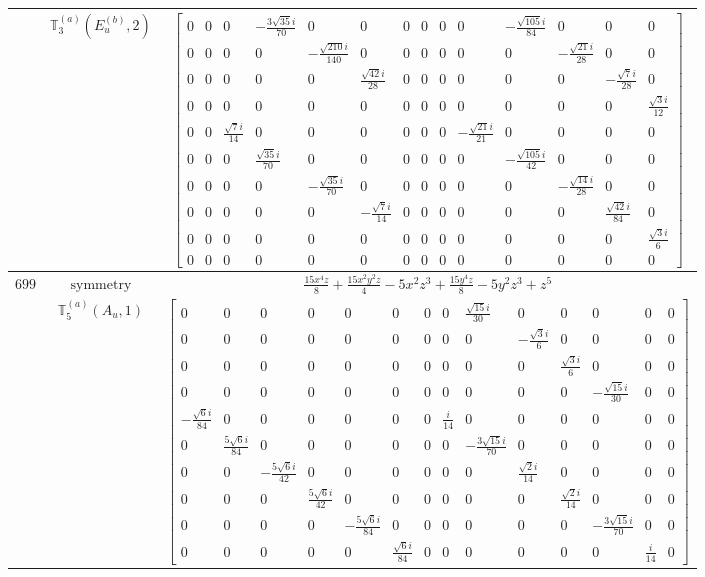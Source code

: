 \documentclass[fleqn,8pt,landscape]{jsarticle}
\begin{document}
\begin{longtable}{ccc}
$  $ & $ \mathbb{T}_{3}^{(a)}(E_{u}^{(b)},2) $ & $ \begin{bmatrix} 0 & 0 & 0 & - \frac{3 \sqrt{35} i}{70} & 0 & 0 & 0 & 0 & 0 & 0 & - \frac{\sqrt{105} i}{84} & 0 & 0 & 0 \\ 0 & 0 & 0 & 0 & - \frac{\sqrt{210} i}{140} & 0 & 0 & 0 & 0 & 0 & 0 & - \frac{\sqrt{21} i}{28} & 0 & 0 \\ 0 & 0 & 0 & 0 & 0 & \frac{\sqrt{42} i}{28} & 0 & 0 & 0 & 0 & 0 & 0 & - \frac{\sqrt{7} i}{28} & 0 \\ 0 & 0 & 0 & 0 & 0 & 0 & 0 & 0 & 0 & 0 & 0 & 0 & 0 & \frac{\sqrt{3} i}{12} \\ 0 & 0 & \frac{\sqrt{7} i}{14} & 0 & 0 & 0 & 0 & 0 & 0 & - \frac{\sqrt{21} i}{21} & 0 & 0 & 0 & 0 \\ 0 & 0 & 0 & \frac{\sqrt{35} i}{70} & 0 & 0 & 0 & 0 & 0 & 0 & - \frac{\sqrt{105} i}{42} & 0 & 0 & 0 \\ 0 & 0 & 0 & 0 & - \frac{\sqrt{35} i}{70} & 0 & 0 & 0 & 0 & 0 & 0 & - \frac{\sqrt{14} i}{28} & 0 & 0 \\ 0 & 0 & 0 & 0 & 0 & - \frac{\sqrt{7} i}{14} & 0 & 0 & 0 & 0 & 0 & 0 & \frac{\sqrt{42} i}{84} & 0 \\ 0 & 0 & 0 & 0 & 0 & 0 & 0 & 0 & 0 & 0 & 0 & 0 & 0 & \frac{\sqrt{3} i}{6} \\ 0 & 0 & 0 & 0 & 0 & 0 & 0 & 0 & 0 & 0 & 0 & 0 & 0 & 0 \end{bmatrix} $ \\ \hline
$ 699 $ & $ \text{symmetry} $ & $ \frac{15 x^{4} z}{8} + \frac{15 x^{2} y^{2} z}{4} - 5 x^{2} z^{3} + \frac{15 y^{4} z}{8} - 5 y^{2} z^{3} + z^{5} $ \\
$  $ & $ \mathbb{T}_{5}^{(a)}(A_{u},1) $ & $ \begin{bmatrix} 0 & 0 & 0 & 0 & 0 & 0 & 0 & 0 & \frac{\sqrt{15} i}{30} & 0 & 0 & 0 & 0 & 0 \\ 0 & 0 & 0 & 0 & 0 & 0 & 0 & 0 & 0 & - \frac{\sqrt{3} i}{6} & 0 & 0 & 0 & 0 \\ 0 & 0 & 0 & 0 & 0 & 0 & 0 & 0 & 0 & 0 & \frac{\sqrt{3} i}{6} & 0 & 0 & 0 \\ 0 & 0 & 0 & 0 & 0 & 0 & 0 & 0 & 0 & 0 & 0 & - \frac{\sqrt{15} i}{30} & 0 & 0 \\ - \frac{\sqrt{6} i}{84} & 0 & 0 & 0 & 0 & 0 & 0 & \frac{i}{14} & 0 & 0 & 0 & 0 & 0 & 0 \\ 0 & \frac{5 \sqrt{6} i}{84} & 0 & 0 & 0 & 0 & 0 & 0 & - \frac{3 \sqrt{15} i}{70} & 0 & 0 & 0 & 0 & 0 \\ 0 & 0 & - \frac{5 \sqrt{6} i}{42} & 0 & 0 & 0 & 0 & 0 & 0 & \frac{\sqrt{2} i}{14} & 0 & 0 & 0 & 0 \\ 0 & 0 & 0 & \frac{5 \sqrt{6} i}{42} & 0 & 0 & 0 & 0 & 0 & 0 & \frac{\sqrt{2} i}{14} & 0 & 0 & 0 \\ 0 & 0 & 0 & 0 & - \frac{5 \sqrt{6} i}{84} & 0 & 0 & 0 & 0 & 0 & 0 & - \frac{3 \sqrt{15} i}{70} & 0 & 0 \\ 0 & 0 & 0 & 0 & 0 & \frac{\sqrt{6} i}{84} & 0 & 0 & 0 & 0 & 0 & 0 & \frac{i}{14} & 0 \end{bmatrix} $ \\ \hline

\end{longtable}
\end{document}
